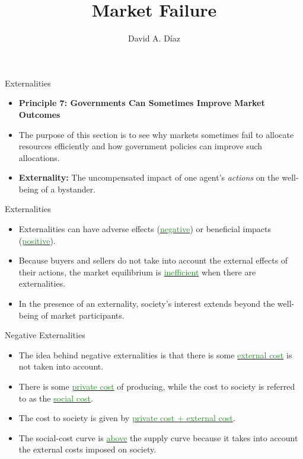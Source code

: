 \documentclass[xcolor={dvipsnames},pdf, hyperref={colorlinks=true, citecolor=ForestGreen, linkcolor=BlueViolet, urlcolor=Magenta}]{beamer}
\title{Market Failure}
\author{David A. D\'iaz}
\institute{UNC Chapel Hill}
\date{}
\newcommand{\defn}[1]{\textbf{#1}}
\newcommand{\dd}[1]{{\underline{\textcolor{ForestGreen}{#1}}}}
\begin{document}
 
	
	\begin{frame}
		
		\titlepage
		
	\end{frame}
	

\begin{frame}{Externalities}
	
	\begin{itemize}
		\item \textbf{Principle 7: Governments Can Sometimes Improve Market Outcomes}
		\item The purpose of this section is to see why markets sometimes fail to allocate resources efficiently and how government policies can improve such allocations.
		\item \defn{Externality:} The uncompensated impact of one agent's \textit{actions} on the well-being of a bystander.
	\end{itemize}
	
\end{frame}	

\begin{frame}{Externalities}
\begin{itemize}
		\item Externalities can have adverse effects (\dd{negative}) or beneficial impacts (\dd{positive}).
		\item Because buyers and sellers do not take into account the external effects of their actions, the market equilibrium is \dd{inefficient} when there are externalities.
		\item In the presence of an externality, society's interest extends beyond the well-being of market participants. 
\end{itemize}
\end{frame}

\begin{frame}{Negative Externalities}
\begin{itemize}
	\item The idea behind negative externalities is that there is some \dd{external cost} is not taken into account. 
	\item There is some \dd{private cost} of producing, while the cost to society is referred to as the \dd{social cost}. 
	\item The cost to society is given by \dd{private cost + external cost}.
	\item The social-cost curve is \dd{above} the supply curve because it takes into account the external costs imposed on society.
\end{itemize}
\end{frame}
\end{document}
